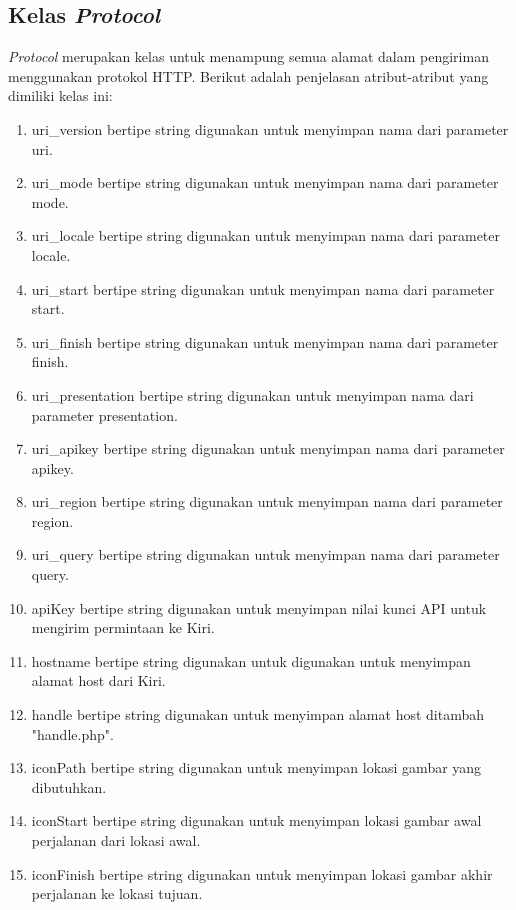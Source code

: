 \subsection{Kelas \textit{Protocol}}
\label{lab:Kelas Protocol}
\hspace{0.5cm} \textit{Protocol} merupakan kelas untuk menampung semua alamat dalam pengiriman menggunakan protokol HTTP. Berikut adalah penjelasan atribut-atribut yang dimiliki kelas ini:
\begin{enumerate}
	\item uri\_version bertipe string digunakan untuk menyimpan nama dari parameter uri.
	\item uri\_mode bertipe string digunakan untuk menyimpan nama dari parameter mode.
	\item uri\_locale bertipe string digunakan untuk menyimpan nama dari parameter locale.
	\item uri\_start bertipe string digunakan untuk menyimpan nama dari parameter start.
	\item uri\_finish bertipe string digunakan untuk menyimpan nama dari parameter finish.
	\item uri\_presentation bertipe string digunakan untuk menyimpan nama dari parameter presentation.
	\item uri\_apikey bertipe string digunakan untuk menyimpan nama dari parameter apikey.
	\item uri\_region bertipe string digunakan untuk menyimpan nama dari parameter region.
	\item uri\_query bertipe string digunakan untuk menyimpan nama dari parameter query.

	\item apiKey bertipe string digunakan untuk menyimpan nilai kunci API untuk mengirim permintaan ke Kiri.
	\item hostname bertipe string digunakan untuk digunakan untuk menyimpan alamat host dari Kiri.
	\item handle bertipe string digunakan untuk menyimpan alamat host ditambah "handle.php".
	\item iconPath bertipe string digunakan untuk menyimpan lokasi gambar yang dibutuhkan.
	\item iconStart bertipe string digunakan untuk menyimpan lokasi gambar awal perjalanan dari lokasi awal.
	\item iconFinish bertipe string digunakan untuk menyimpan lokasi gambar akhir perjalanan ke lokasi tujuan.
	

\end{enumerate}
